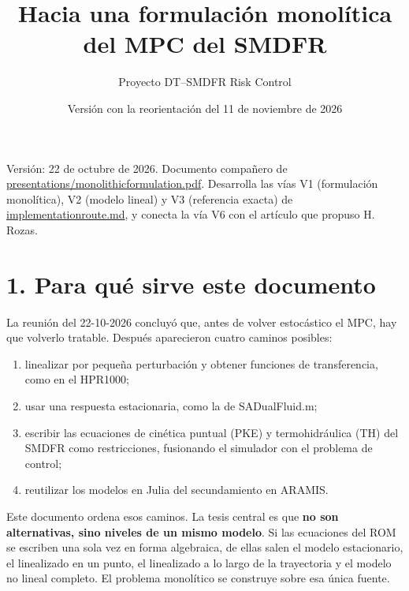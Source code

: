 \documentclass[11pt,a4paper]{article}
\title{\color{accent}\bfseries Hacia una formulación monolítica del MPC del SMDFR}
\author{Proyecto DT--SMDFR Risk Control}
\date{Versión con la reorientación del 11 de noviembre de 2026}
\newcommand{\codeus}{\textunderscore\allowbreak}
\newcommand{\code}[1]{{\small\ttfamily\let\_\codeus #1}}
\begin{document}
\maketitle
\tableofcontents
\bigskip
Versión: 22 de octubre de 2026. Documento compañero de \href{../presentations/monolithic_formulation.pdf}{\code{presentations/monolithic\_formulation.pdf}}. Desarrolla las vías V1 (formulación monolítica), V2 (modelo lineal) y V3 (referencia exacta) de \href{implementation_route.md}{\code{implementation\_route.md}}, y conecta la vía V6 con el artículo que propuso H. Rozas.

\medskip
\section*{1. Para qué sirve este documento}
La reunión del 22-10-2026 concluyó que, antes de volver estocástico el MPC, hay que volverlo tratable. Después aparecieron cuatro caminos posibles:

\begin{enumerate}
\item linealizar por pequeña perturbación y obtener funciones de transferencia, como en el HPR1000;
\item usar una respuesta estacionaria, como la de \code{SA\_DualFluid.m};
\item escribir las ecuaciones de cinética puntual (PKE) y termohidráulica (TH) del SMDFR como restricciones, fusionando el simulador con el problema de control;
\item reutilizar los modelos en Julia del secundamiento en ARAMIS.
\end{enumerate}

Este documento ordena esos caminos. La tesis central es que \textbf{no son alternativas, sino niveles de un mismo modelo}. Si las ecuaciones del ROM se escriben una sola vez en forma algebraica, de ellas salen el modelo estacionario, el linealizado en un punto, el linealizado a lo largo de la trayectoria y el modelo no lineal completo. El problema monolítico se construye sobre esa única fuente.

\medskip
\end{document}

